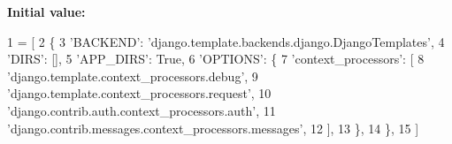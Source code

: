 {\bfseries Initial value\+:}
\begin{DoxyCode}
1 =  [
2     \{
3         \textcolor{stringliteral}{'BACKEND'}: \textcolor{stringliteral}{'django.template.backends.django.DjangoTemplates'},
4         \textcolor{stringliteral}{'DIRS'}: [],
5         \textcolor{stringliteral}{'APP\_DIRS'}: \textcolor{keyword}{True},
6         \textcolor{stringliteral}{'OPTIONS'}: \{
7             \textcolor{stringliteral}{'context\_processors'}: [
8                 \textcolor{stringliteral}{'django.template.context\_processors.debug'},
9                 \textcolor{stringliteral}{'django.template.context\_processors.request'},
10                 \textcolor{stringliteral}{'django.contrib.auth.context\_processors.auth'},
11                 \textcolor{stringliteral}{'django.contrib.messages.context\_processors.messages'},
12             ],
13         \},
14     \},
15 ]
\end{DoxyCode}
